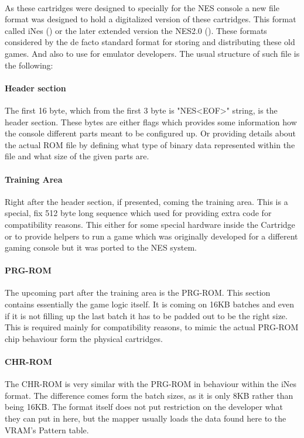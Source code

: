 \documentclass[]{report}
\begin{document}
\paragraph{ }
As these cartridges were designed to specially for the NES console a new file format was designed to hold a digitalized version of these cartridges. This format called iNes (\cite{INES}) or the later extended version the NES2.0 (\cite{INS2}). These formats considered by the de facto standard format for storing and distributing these old games. And also to use for emulator developers.
The usual structure of such file is the following:

\paragraph{Header section}
The first 16 byte, which from the first 3 byte is "NES<EOF>" string, is the header section. These bytes are either flags which provides some information how the console different parts meant to be configured up. Or providing details about the actual ROM file by defining what type of binary data represented within the file and what size of the given parts are.

\paragraph{Training Area}
Right after the header section, if presented, coming the training area. This is a special, fix 512 byte long sequence which used for providing extra code for compatibility reasons. This either for some special hardware inside the Cartridge or to provide helpers to run a game which was originally developed for a different gaming console but it was ported to the NES system.

\paragraph{PRG-ROM}
The upcoming part after the training area is the PRG-ROM. This section contains essentially the game logic itself. It is coming on 16KB batches and even if it is not filling up the last batch it has to be padded out to be the right size. This is required mainly for compatibility reasons, to mimic the actual PRG-ROM chip behaviour form the physical cartridges.

\paragraph{CHR-ROM}
The CHR-ROM is very similar with the PRG-ROM in behaviour within the iNes format. The difference comes form the batch sizes, as it is only 8KB rather than being 16KB. The format itself does not put restriction on the developer what they can put in here, but the mapper usually loads the data found here to the VRAM's Pattern table.
\end{document}
